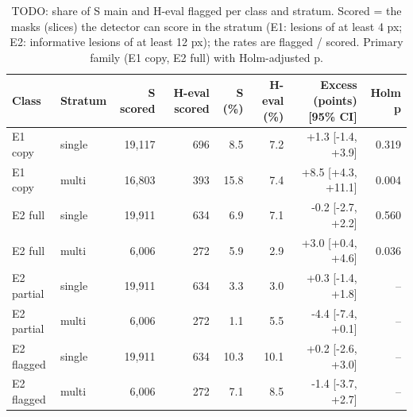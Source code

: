 \begin{table}
\centering
\footnotesize
\begin{tabular}{llrrrrrr}
\toprule
Class & Stratum & S scored & H-eval scored & S (\%) & H-eval (\%) & Excess (points) [95\% CI] & Holm p \\
\midrule
E1 copy & single & 19,117 & 696 & 8.5 & 7.2 & +1.3 [-1.4, +3.9] & 0.319 \\
E1 copy & multi & 16,803 & 393 & 15.8 & 7.4 & +8.5 [+4.3, +11.1] & 0.004 \\
E2 full & single & 19,911 & 634 & 6.9 & 7.1 & -0.2 [-2.7, +2.2] & 0.560 \\
E2 full & multi & 6,006 & 272 & 5.9 & 2.9 & +3.0 [+0.4, +4.6] & 0.036 \\
E2 partial & single & 19,911 & 634 & 3.3 & 3.0 & +0.3 [-1.4, +1.8] & -- \\
E2 partial & multi & 6,006 & 272 & 1.1 & 5.5 & -4.4 [-7.4, +0.1] & -- \\
E2 flagged & single & 19,911 & 634 & 10.3 & 10.1 & +0.2 [-2.6, +3.0] & -- \\
E2 flagged & multi & 6,006 & 272 & 7.1 & 8.5 & -1.4 [-3.7, +2.7] & -- \\
\bottomrule
\end{tabular}
\caption{TODO: share of S main and H-eval flagged per class and stratum. Scored = the masks (slices) the detector can score in the stratum (E1: lesions of at least 4 px; E2: informative lesions of at least 12 px); the rates are flagged / scored. Primary family (E1 copy, E2 full) with Holm-adjusted p.}
\label{tab:main_audit}
\end{table}

